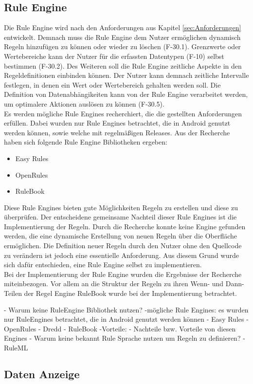 \subsection{Rule Engine}
Die Rule Engine wird nach den Anforderungen aus Kapitel \ref{sec:Anforderungen} entwickelt. Demnach muss die Rule Engine dem Nutzer ermöglichen dynamisch Regeln hinzufügen zu können oder wieder zu löschen (F-30.1). Grenzwerte oder Wertebereiche kann der Nutzer für die erfassten Datentypen (F-10) selbst bestimmen (F-30.2). Des Weiteren soll die Rule Engine zeitliche Aspekte in den Regeldefinitionen einbinden können. Der Nutzer kann demnach zeitliche Intervalle festlegen, in denen ein Wert oder Wertebereich gehalten werden soll. Die Definition von Datenabhängikeiten kann von der Rule Engine verarbeitet werden, um optimalere Aktionen auslösen zu können (F-30.5).\\
Es werden mögliche Rule Engines recherchiert, die die gestellten Anforderungen erfüllen. Dabei wurden nur Rule Engines betrachtet, die in Android genutzt werden können, sowie welche mit regelmäßigen Releases. Aus der Recherche haben sich folgende Rule Engine Bibliotheken ergeben:
\begin{itemize}                                                                                                                                                                                                                                                                                                                                                                                              
	\item Easy Rules \cite{github:easyrules}
	\item OpenRules \cite{openrules}
	\item RuleBook \cite{github:rulebook}
\end{itemize}
Diese Rule Engines bieten gute Möglichkeiten Regeln zu erstellen und diese zu überprüfen. Der entscheidene gemeinsame Nachteil dieser Rule Engines ist die Implementierung der Regeln. Durch die Recherche konnte keine Engine gefunden werden, die eine dynamische Erstellung von neuen Regeln über die Oberfläche ermöglichen. Die Definition neuer Regeln durch den Nutzer ohne den Quellcode zu verändern ist jedoch eine essentielle Anforderung. Aus diesem Grund wurde sich dafür entschieden, eine Rule Engine selbst zu implementieren.\\
Bei der Implementierung der Rule Engine wurden die Ergebnisse der Recherche miteinbezogen. Vor allem an die Struktur der Regeln zu ihren Wenn- und Dann-Teilen der Regel Engine RuleBook wurde bei der Implementierung betrachtet.


- Warum keine RuleEngine Bibliothek nutzen?
-mögliche Rule Engines: es wurden nur RuleEngines betrachtet, die in Android genutzt werden können
- Easy Rules
- OpenRules
- Dredd
- RuleBook
-Vorteile:  
- Nachteile bzw. Vorteile von diesen Engines
- Warum keine bekannt Rule Sprache nutzen um Regeln zu definieren? - RuleML

\subsection{Daten Anzeige}